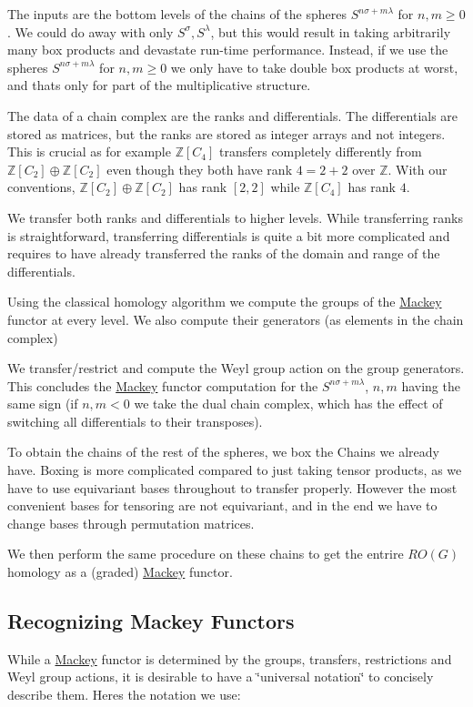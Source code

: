 \begin{DoxyItemize}
\item The inputs are the bottom levels of the chains of the spheres $S^{n\sigma+m\lambda}$ for $n,m\ge 0$. We could do away with only $S^{\sigma},S^{\lambda}$, but this would result in taking arbitrarily many box products and devastate run-\/time performance. Instead, if we use the spheres $S^{n\sigma+m\lambda}$ for $n,m\ge 0$ we only have to take double box products at worst, and that\textquotesingle{}s only for part of the multiplicative structure.
\item The data of a chain complex are the ranks and differentials. The differentials are stored as matrices, but the ranks are stored as integer arrays and not integers. This is crucial as for example $\mathbb Z[C_4]$ transfers completely differently from $\mathbb Z[C_2]\oplus \mathbb Z[C_2]$ even though they both have rank $4=2+2$ over $\mathbb Z$. With our conventions, $\mathbb Z[C_2]\oplus \mathbb Z[C_2]$ has rank $[2,2]$ while $\mathbb Z[C_4]$ has rank $4$.
\item We transfer both ranks and differentials to higher levels. While transferring ranks is straightforward, transferring differentials is quite a bit more complicated and requires to have already transferred the ranks of the domain and range of the differentials.
\item Using the classical homology algorithm we compute the groups of the \hyperlink{namespaceMackey}{Mackey} functor at every level. We also compute their generators (as elements in the chain complex)
\item We transfer/restrict and compute the Weyl group action on the group generators. This concludes the \hyperlink{namespaceMackey}{Mackey} functor computation for the $S^{n\sigma+m\lambda}$, $n,m$ having the same sign (if $n,m<0$ we take the dual chain complex, which has the effect of switching all differentials to their transposes).
\item To obtain the chains of the rest of the spheres, we box the Chains we already have. Boxing is more complicated compared to just taking tensor products, as we have to use equivariant bases throughout to transfer properly. However the most convenient bases for tensoring are not equivariant, and in the end we have to change bases through permutation matrices.
\item We then perform the same procedure on these chains to get the entrire $RO(G)$ homology as a (graded) \hyperlink{namespaceMackey}{Mackey} functor.
\end{DoxyItemize}\hypertarget{math_mack}{}\subsection{Recognizing Mackey Functors}\label{math_mack}
While a \hyperlink{namespaceMackey}{Mackey} functor is determined by the groups, transfers, restrictions and Weyl group actions, it is desirable to have a \char`\"{}universal notation\char`\"{} to concisely describe them. Here\textquotesingle{}s the notation we use\+:


